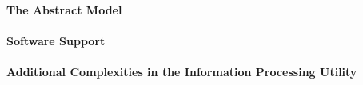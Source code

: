 \documentclass[
  12pt]{findlay}
\begin{document}
\hypertarget{the-abstract-model}{%
\paragraph{The Abstract Model}\label{the-abstract-model}}

\hypertarget{software-support}{%
\paragraph{Software Support}\label{software-support}}

\hypertarget{additional-complexities-in-the-information-processing-utility}{%
\paragraph{Additional Complexities in the Information Processing
Utility}\label{additional-complexities-in-the-information-processing-utility}}

\printbibliography
\end{document}
